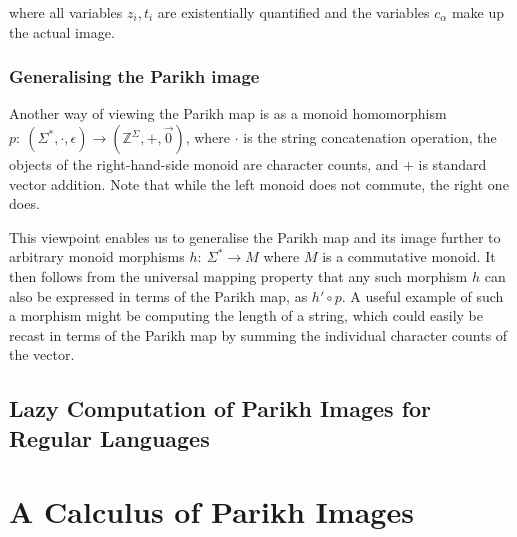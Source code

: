\documentclass[runningheads]{llncs}
\newif\ifoutline
\newcommand{\contents}[1]{\ifoutline{\color{blue}
    \begin{itemize}
    #1
    \end{itemize}
  }\fi}
\begin{document}
where all variables $z_i, t_i$ are existentially quantified and the variables $c_\alpha$ make up the actual image.

\subsubsection{Generalising the Parikh image}

Another way of viewing the Parikh map is as a monoid homomorphism $p:\: \left(\Sigma^*, \cdot, \epsilon \right) \to (\mathbb{Z}^\Sigma, +, \vec{0})$, where $\cdot$ is the string concatenation operation, the objects of the right-hand-side monoid are character counts, and $+$ is standard vector addition. Note that while the left monoid does not commute, the right one does.

This viewpoint enables us to generalise the Parikh map and its image further to arbitrary monoid morphisms $h:\: \Sigma^* \to M$ where $M$ is a commutative monoid. It then follows from the universal mapping property that any such morphism $h$ can also be expressed in terms of the Parikh map, as $h' \circ p$. A useful example of such a morphism might be computing the length of a string, which could easily be recast in terms of the Parikh map by summing the individual character counts of the vector.

\contents{
\item Examples
\item Fix the formalised version
\item Verify that the category theory is correct
}

\subsection{Lazy Computation of Parikh Images for Regular Languages}

\contents{
\item Lazy expansion of the Parikh conditions for a symbolic automaton
\item Finding elements vs.\ computing the complete Parikh image
\item Lazy product computation
}

\section{A Calculus of Parikh Images}

\contents{
\item Preliminaries, the underlying calculus, what are rules
\item Predicates used to represent Parikh images
\item Our calculus rules
\item Statement of properties, correctness, complexity
}
\end{document}
